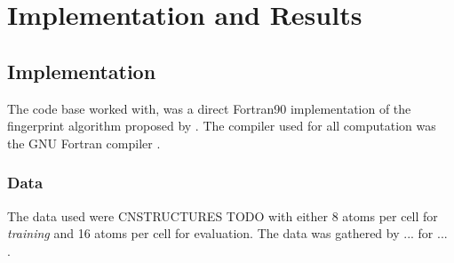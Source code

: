 
\chapter{Implementation and Results} %

\label{Chapter2} %


\section{Implementation}
The code base worked with, was a direct Fortran90 implementation of the fingerprint algorithm proposed by \cite{Zhu2016}. The compiler used for all computation was the GNU Fortran compiler \cite{gnufortran}.

\subsection{Data}
The data used were CNSTRUCTURES TODO with either 8 atoms per cell for \emph{training} and 16 atoms per cell for evaluation. The data was gathered by ... for ... . 

